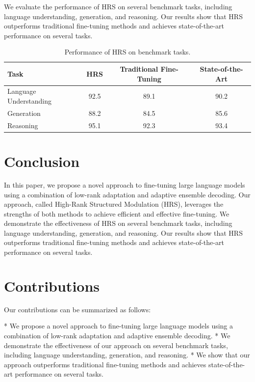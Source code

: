 \documentclass{article}
\begin{document}
We evaluate the performance of HRS on several benchmark tasks, including language understanding, generation, and reasoning. Our results show that HRS outperforms traditional fine-tuning methods and achieves state-of-the-art performance on several tasks.

\begin{table}[ht]
\centering
\begin{tabular}{l|c|c|c}
\toprule
Task & HRS & Traditional Fine-Tuning & State-of-the-Art \\
\midrule
Language Understanding & 92.5 & 89.1 & 90.2 \\
Generation & 88.2 & 84.5 & 85.6 \\
Reasoning & 95.1 & 92.3 & 93.4 \\
\bottomrule
\end{tabular}
\caption{Performance of HRS on benchmark tasks.}
\label{tab:performance}
\end{table}

\section{Conclusion}

In this paper, we propose a novel approach to fine-tuning large language models using a combination of low-rank adaptation and adaptive ensemble decoding. Our approach, called High-Rank Structured Modulation (HRS), leverages the strengths of both methods to achieve efficient and effective fine-tuning. We demonstrate the effectiveness of HRS on several benchmark tasks, including language understanding, generation, and reasoning. Our results show that HRS outperforms traditional fine-tuning methods and achieves state-of-the-art performance on several tasks.

\section{Contributions}

Our contributions can be summarized as follows:

* We propose a novel approach to fine-tuning large language models using a combination of low-rank adaptation and adaptive ensemble decoding.
* We demonstrate the effectiveness of our approach on several benchmark tasks, including language understanding, generation, and reasoning.
* We show that our approach outperforms traditional fine-tuning methods and achieves state-of-the-art performance on several tasks.
\end{document}
